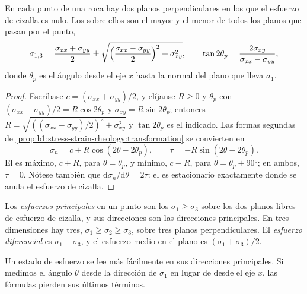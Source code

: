 \begin{theorem}\label{thm:b1:stress-strain-rheology:principal}
En cada punto de una roca hay dos planos perpendiculares en los que el esfuerzo de cizalla es nulo. Los  sobre ellos son el mayor y el
menor  de todos los planos que pasan por el punto,
\[
  \sigma_{1,3} = \frac{\sigma_{xx}+\sigma_{yy}}{2} \pm
  \sqrt{\Bigl(\frac{\sigma_{xx}-\sigma_{yy}}{2}\Bigr)^2 + \sigma_{xy}^2},
  \qquad \tan2\theta_p = \frac{2\sigma_{xy}}{\sigma_{xx}-\sigma_{yy}},
\]
donde $\theta_p$ es el ángulo desde el eje $x$ hasta la normal del plano que lleva $\sigma_1$.
\end{theorem}

\begin{proof}
Escríbase $c = (\sigma_{xx}+\sigma_{yy})/2$, y elíjanse $R \ge 0$ y $\theta_p$ con $(\sigma_{xx}-\sigma_{yy})/2 = R\cos2\theta_p$ y $\sigma_{xy} = R\sin2\theta_p$;
entonces $R = \sqrt{((\sigma_{xx}-\sigma_{yy})/2)^2 + \sigma_{xy}^2}$ y $\tan2\theta_p$ es el indicado. Las formas segundas de
\cref{prop:b1:stress-strain-rheology:transformation} se convierten en
\[
  \sigma_n = c + R\cos(2\theta - 2\theta_p), \qquad \tau = -R\sin(2\theta - 2\theta_p).
\]
El  es máximo, $c + R$, para $\theta = \theta_p$, y mínimo, $c - R$, para $\theta = \theta_p + \ang{90}$; en ambos, $\tau = 0$. Nótese también
que $\mathrm d\sigma_n/\mathrm d\theta = 2\tau$: el  es estacionario exactamente donde se anula el esfuerzo de cizalla.
\end{proof}

\begin{definition}\label{def:b1:stress-strain-rheology:principal}
Los \emph{esfuerzos principales} en un punto son los  $\sigma_1 \ge \sigma_3$ sobre los dos planos libres de
esfuerzo de cizalla, y sus direcciones son las direcciones principales. En tres dimensiones hay tres, $\sigma_1 \ge \sigma_2 \ge \sigma_3$, sobre tres planos
perpendiculares. El \emph{esfuerzo diferencial} es $\sigma_1 - \sigma_3$, y el esfuerzo medio en el plano es $(\sigma_1+\sigma_3)/2$.
\end{definition}

Un estado de esfuerzo se lee más fácilmente en sus direcciones principales. Si medimos el ángulo $\theta$ desde la dirección de $\sigma_1$ en lugar de desde el
eje $x$, las fórmulas pierden sus últimos términos.

